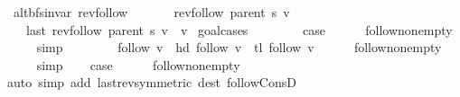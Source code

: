 \begin{isabellebody}
{}
\isamarkuptrue%
%
\endisatagdocument
{\isafolddocument}%
%
\isadelimdocument
%
\endisadelimdocument
{}\isamarkupfalse%
\ {\isacharparenleft}{\kern0pt}\ alt{\isacharunderscore}{\kern0pt}bfs{\isacharunderscore}{\kern0pt}invar{\isacharparenright}{\kern0pt}\ rev{\isacharunderscore}{\kern0pt}follow{\isacharcolon}{\kern0pt}\isanewline
\ \ \isanewline
\ \ \ \ {\isachardoublequoteopen}rev{\isacharunderscore}{\kern0pt}follow\ {\isacharparenleft}{\kern0pt}parent\ s{\isacharparenright}{\kern0pt}\ v\ {\isasymnoteq}\ {\isacharbrackleft}{\kern0pt}{\isacharbrackright}{\kern0pt}{\isachardoublequoteclose}\isanewline
\ \ \ \ {\isachardoublequoteopen}last\ {\isacharparenleft}{\kern0pt}rev{\isacharunderscore}{\kern0pt}follow\ {\isacharparenleft}{\kern0pt}parent\ s{\isacharparenright}{\kern0pt}\ v{\isacharparenright}{\kern0pt}\ {\isacharequal}{\kern0pt}\ v{\isachardoublequoteclose}\isanewline
%
\isadelimproof
%
\endisadelimproof
%
\isatagproof
{}\isamarkupfalse%
\ {\isacharparenleft}{\kern0pt}goal{\isacharunderscore}{\kern0pt}cases{\isacharparenright}{\kern0pt}\isanewline
\ \ \isamarkupfalse%
\ {}\isanewline
\ \ \isamarkupfalse%
\ {\isacharquery}{\kern0pt}case\isanewline
\ \ \ \ \isamarkupfalse%
\ follow{\isacharunderscore}{\kern0pt}non{\isacharunderscore}{\kern0pt}empty\isanewline
\ \ \ \ \isamarkupfalse%
\ simp\isanewline
{}\isamarkupfalse%
\isanewline
\ \ \isamarkupfalse%
\ {}\isanewline
\ \ \isamarkupfalse%
\ {\isachardoublequoteopen}follow\ v\ {\isacharequal}{\kern0pt}\ hd\ {\isacharparenleft}{\kern0pt}follow\ v{\isacharparenright}{\kern0pt}\ {\isacharhash}{\kern0pt}\ tl\ {\isacharparenleft}{\kern0pt}follow\ v{\isacharparenright}{\kern0pt}{\isachardoublequoteclose}\isanewline
\ \ \ \ \isamarkupfalse%
\ follow{\isacharunderscore}{\kern0pt}non{\isacharunderscore}{\kern0pt}empty\isanewline
\ \ \ \ \isamarkupfalse%
\ simp\isanewline
\ \ \isamarkupfalse%
\ {\isacharquery}{\kern0pt}case\isanewline
\ \ \ \ \isamarkupfalse%
\ follow{\isacharunderscore}{\kern0pt}non{\isacharunderscore}{\kern0pt}empty\isanewline
\ \ \ \ \isamarkupfalse%
\ {\isacharparenleft}{\kern0pt}auto\ simp\ add{\isacharcolon}{\kern0pt}\ last{\isacharunderscore}{\kern0pt}rev{\isacharbrackleft}{\kern0pt}symmetric{\isacharbrackright}{\kern0pt}\ dest{\isacharcolon}{\kern0pt}\ follow{\isacharunderscore}{\kern0pt}ConsD{\isacharparenright}{\kern0pt}\isanewline

\end{isabellebody}
